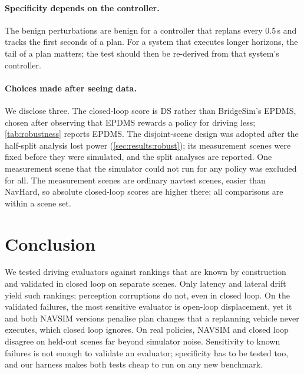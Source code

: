 \paragraph{Specificity depends on the controller.}
The benign perturbations are benign for a controller that replans every $0.5$\,s and tracks the first
seconds of a plan.
For a system that executes longer horizons, the tail of a plan matters; the test should then be
re-derived from that system's controller.

\paragraph{Choices made after seeing data.}
We disclose three.
The closed-loop score is DS rather than BridgeSim's EPDMS, chosen after observing that EPDMS rewards a
policy for driving less; \cref{tab:robustness} reports EPDMS.
The disjoint-scene design was adopted after the half-split analysis lost power
(\cref{sec:results:robust}); its measurement scenes were fixed before they were simulated, and the
split analyses are reported.
One measurement scene that the simulator could not run for any policy was excluded for all.
The measurement scenes are ordinary navtest scenes, easier than NavHard, so absolute closed-loop
scores are higher there; all comparisons are within a scene set.

\section{Conclusion}
We tested driving evaluators against rankings that are known by construction and validated in closed
loop on separate scenes.
Only latency and lateral drift yield such rankings; perception corruptions do not, even in closed loop.
On the validated failures, the most sensitive evaluator is open-loop displacement, yet it and both
NAVSIM versions penalise plan changes that a replanning vehicle never executes, which closed loop
ignores.
On real policies, NAVSIM and closed loop disagree on held-out scenes far beyond simulator noise.
Sensitivity to known failures is not enough to validate an evaluator; specificity has to be tested too,
and our harness makes both tests cheap to run on any new benchmark.
